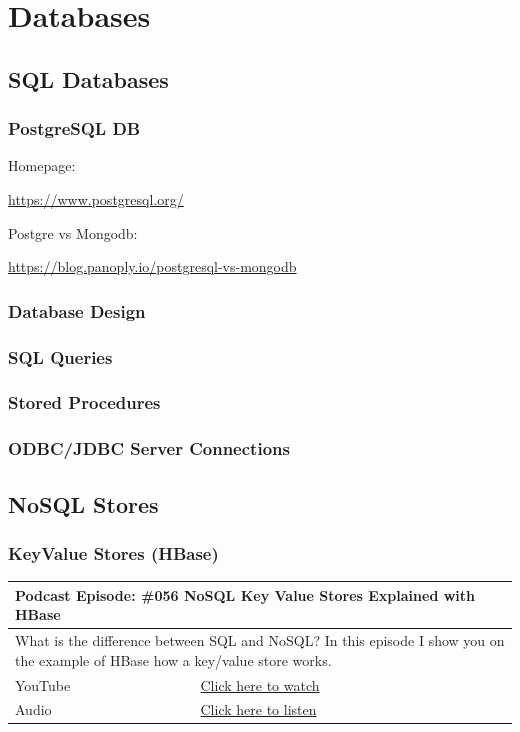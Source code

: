 \documentclass[12pt, numbers=noenddot]{scrreprt} %
\begin{document}
\chapter{Databases}

\section{SQL Databases}

\subsection{PostgreSQL DB}

Homepage:

\url{https://www.postgresql.org/}
 
Postgre vs Mongodb:

\url{https://blog.panoply.io/postgresql-vs-mongodb}


\subsection{Database Design}
\subsection{SQL Queries}
\subsection{Stored Procedures}
\subsection{ODBC/JDBC Server Connections}

\section{NoSQL Stores}
\subsection{KeyValue Stores (HBase)}

\begin{table}[h]
\begin{tabular}{ll}
\hline
\multicolumn{2}{l}{\textbf{Podcast Episode:} \#056 NoSQL Key Value Stores Explained with HBase} \\ \hline
\multicolumn{2}{p{15cm}}{What is the difference between SQL and NoSQL? In this episode I show you on the example of HBase how a key/value store works. }         \\ \hline
\multicolumn{1}{l|}{YouTube}   & \href{https://youtu.be/67hIkbpzFc8}{Click here to watch}   \\ 
\multicolumn{1}{l|}{Audio}     & \href{https://anchor.fm/andreaskayy/episodes/056-NoSQL-Key-Value-Stores-Explained-With-HBase-e45ifb}{Click here to listen}   \\ \hline
\end{tabular}
\end{table}
\end{document}
